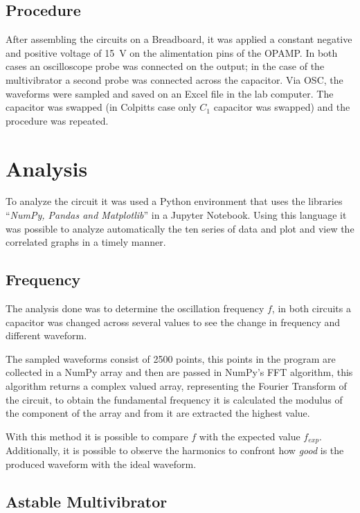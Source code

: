 \documentclass[a4paper, twocolumn]{article}
\begin{document}
\subsection{Procedure}

After assembling the circuits on a Breadboard, it was applied a constant negative and positive voltage of \SI{15}{\volt} on the alimentation pins of the OPAMP. In both cases an oscilloscope probe was connected on the output; in the case of the multivibrator a second probe was connected across the capacitor.  Via OSC, the waveforms were sampled and saved on an Excel file in the lab computer. 
The capacitor was swapped (in Colpitts case only $C_1$ capacitor was swapped) and the procedure was repeated.

\section{Analysis}

To analyze the circuit it was used a Python environment that uses the libraries ``\emph{NumPy, Pandas and Matplotlib}'' in a Jupyter Notebook. Using this language it was possible to analyze automatically the ten series of data and plot and view the correlated graphs in a timely manner. 


\subsection{Frequency}

The analysis done was to determine the oscillation frequency $f$, in both circuits a capacitor was changed across several values to see the change in frequency and different waveform.

The sampled waveforms consist of 2500 points, this points in the program are collected in a NumPy array and then are passed in NumPy's FFT algorithm, this algorithm returns a complex valued array, representing the Fourier Transform of the circuit, to obtain the fundamental frequency it is calculated the modulus of the component of the array and from it are extracted the highest value.

With this method it is possible to compare $f$ with the expected value $f_{exp}$. Additionally, it is possible to observe the harmonics to confront how \emph{good} is the produced waveform with the ideal waveform.

\subsection{Astable Multivibrator}
\end{document}
